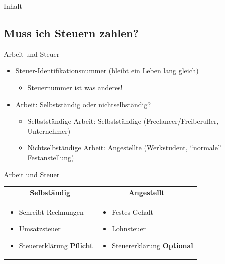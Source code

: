 \documentclass{beamer}
\begin{document}
		\begin{frame}[t]{Inhalt}
		\end{frame}
	
		\subsection{Muss ich Steuern zahlen?}
		
			\begin{frame}{Arbeit und Steuer}
				\begin{itemize}
					\item Steuer-Identifikationsnummer (bleibt ein Leben lang gleich)
					\begin{itemize}
						\item Steuernummer ist was anderes!
					\end{itemize}
					\item Arbeit: Selbstständig oder nichtselbständig?
					\begin{itemize}
						\item Selbstständige Arbeit: Selbstständige (Freelancer/Freiberufler, Unternehmer)
						\item Nichtselbständige Arbeit: Angestellte (Werkstudent, "`normale"' Festanstellung)
					\end{itemize}
				\end{itemize}
			\end{frame}
		
			\begin{frame}{Arbeit und Steuer}
				\begin{tabularx}{\linewidth}{X|X}
					\multicolumn{1}{c|}{\textbf{Selbständig}\citewiki{Selbständigkeit\_(beruflich)\#Steuerrecht}} &
					\multicolumn{1}{c}{\textbf{Angestellt}} \\[0.25cm]
					\begin{itemize}
						\item Schreibt Rechnungen
						\item Umsatzsteuer
						\item Steuererklärung \textbf{Pflicht}
					\end{itemize} &
					\begin{itemize}
						\item Festes Gehalt
						\item Lohnsteuer
						\item Steuererklärung \textbf{Optional}
					\end{itemize}
				\end{tabularx}
			\end{frame}
		
\end{document}
